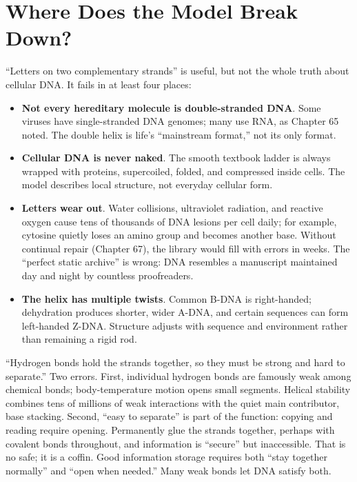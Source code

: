 \section{Where Does the Model Break Down?}

``Letters on two complementary strands'' is useful, but not the whole truth about cellular DNA. It fails in at least four places:

\begin{itemize}[itemsep=2pt]
\item \textbf{Not every hereditary molecule is double-stranded DNA}. Some viruses have single-stranded DNA genomes; many use RNA, as Chapter 65 noted. The double helix is life's ``mainstream format,'' not its only format.
\item \textbf{Cellular DNA is never naked}. The smooth textbook ladder is always wrapped with proteins, supercoiled, folded, and compressed inside cells. The model describes local structure, not everyday cellular form.
\item \textbf{Letters wear out}. Water collisions, ultraviolet radiation, and reactive oxygen cause tens of thousands of DNA lesions per cell daily; for example, cytosine quietly loses an amino group and becomes another base. Without continual repair (Chapter 67), the library would fill with errors in weeks. The ``perfect static archive'' is wrong: DNA resembles a manuscript maintained day and night by countless proofreaders.
\item \textbf{The helix has multiple twists}. Common B-DNA is right-handed; dehydration produces shorter, wider A-DNA, and certain sequences can form left-handed Z-DNA. Structure adjusts with sequence and environment rather than remaining a rigid rod.
\end{itemize}

\begin{wuqu}
``Hydrogen bonds hold the strands together, so they must be strong and hard to separate.'' Two errors. First, individual hydrogen bonds are famously weak among chemical bonds; body-temperature motion opens small segments. Helical stability combines tens of millions of weak interactions with the quiet main contributor, base stacking. Second, ``easy to separate'' is part of the function: copying and reading require opening. Permanently glue the strands together, perhaps with covalent bonds throughout, and information is ``secure'' but inaccessible. That is no safe; it is a coffin. Good information storage requires both ``stay together normally'' and ``open when needed.'' Many weak bonds let DNA satisfy both.
\end{wuqu}

